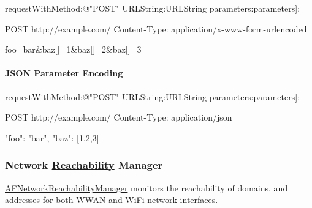 \begin{DoxyCode}
[[AFHTTPRequestSerializer serializer] requestWithMethod:@"POST" URLString:URLString parameters:parameters];
\end{DoxyCode}
 \begin{DoxyVerb}POST http://example.com/
Content-Type: application/x-www-form-urlencoded

foo=bar&baz[]=1&baz[]=2&baz[]=3
\end{DoxyVerb}


\paragraph*{J\+S\+ON Parameter Encoding}


\begin{DoxyCode}
[[AFJSONRequestSerializer serializer] requestWithMethod:@"POST" URLString:URLString parameters:parameters];
\end{DoxyCode}
 \begin{DoxyVerb}POST http://example.com/
Content-Type: application/json

{"foo": "bar", "baz": [1,2,3]}
\end{DoxyVerb}






\subsubsection*{Network \mbox{\hyperlink{interface_reachability}{Reachability}} Manager}

{\ttfamily \mbox{\hyperlink{interface_a_f_network_reachability_manager}{A\+F\+Network\+Reachability\+Manager}}} monitors the reachability of domains, and addresses for both W\+W\+AN and Wi\+Fi network interfaces.


